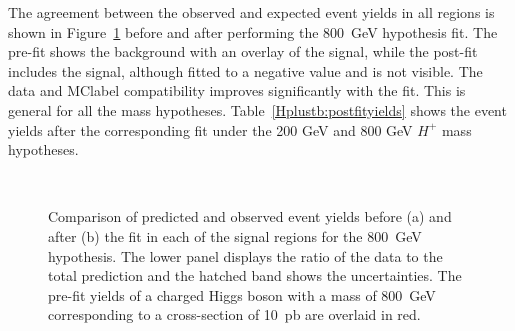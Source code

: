 The agreement between the observed and expected event yields in all regions is shown in Figure~\ref{Hplustb:Summaryyieldsplot800} before and after performing the 800~GeV hypothesis fit. The pre-fit shows the background with an overlay of the signal, while the post-fit includes the signal, although fitted to a negative value and is not visible. The data and \acrshort{MClabel} compatibility improves significantly with the fit. This is general for all the mass hypotheses. Table~\ref{Hplustb:postfityields} shows the event yields after the corresponding fit under the 200 GeV and 800 GeV $H^+$ mass hypotheses.

\begin{figure}[htb]
    \RawFloats
    \centering
    \\
    \caption{Comparison of predicted and observed event yields before (a) and after (b) the fit in each of the signal regions for the 800~GeV hypothesis. The lower panel displays the ratio of the data to the total prediction and the hatched band shows the uncertainties. The pre-fit yields of a charged Higgs boson with a mass of 800~GeV corresponding to a cross-section of 10~pb are overlaid in red.}
    \label{Hplustb:Summaryyieldsplot800}
\end{figure}


